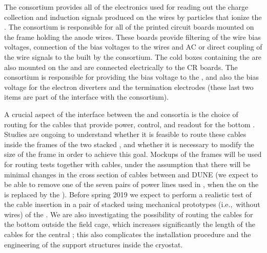 The  consortium provides all of the electronics used for reading out the charge
collection and induction signals produced on the  wires by particles that ionize
the \lar. The  consortium
is responsible for all of the printed circuit boards mounted on the  frame
holding the anode wires. These boards provide filtering of the wire bias voltages,
connection of the bias voltages to the wires and AC or direct coupling of the
wire signals to the  built by the  consortium.
The cold boxes containing the  are also mounted on the  and are connected
electrically to the CR boards. The  consortium is responsible for providing the bias
voltage to the , and also the bias voltage for the electron diverters and the  termination electrodes (these last two items are part of the interface with
the  consortium).

A crucial aspect of the interface between the  and  consortia
is the choice of routing for the cables that provide power, control, and readout
for the bottom . Studies are ongoing to understand whether it is feasible to
route these cables inside the  frames of the two stacked , and whether it
is necessary to modify the size of the  frame in order to achieve this goal.
Mockups of the  frames will be used for routing tests together with 
cables, under the assumption that there will be minimal changes in the cross
section of cables between  and DUNE (we expect to be able to remove one
of the seven pairs of power lines used in , when the  on the
 is replaced by the  ). Before spring 2019 we expect to perform
a realistic test of the cable insertion in a pair of stacked  using
mechanical prototypes (i.e.,~without wires) of the . We are also investigating
the possibility of routing the cables for the bottom  outside the field
cage, which increases significantly the length of the cables for the central
; this also complicates the installation procedure and the engineering of the
support structures inside the cryostat.
